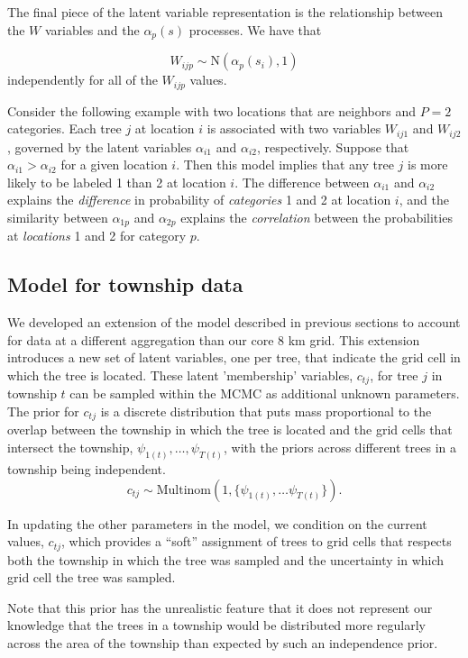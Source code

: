 \documentclass[12pt]{article}\usepackage[]{graphicx}\usepackage[]{color}
\begin{document}
\noindent The final piece of the latent variable representation is
the relationship between the $W$ variables and the $\alpha_{p}(s)$
processes. We have that

\noindent 
\[
W_{ijp}\sim\mbox{N}(\alpha_{p}(s_{i}),1)
\]
independently for all of the $W_{ijp}$ values. 

\noindent Consider the following example with two locations that are
neighbors and $P=2$ categories. Each tree $j$ at location $i$ is
associated with two variables $W_{ij1}$ and $W_{ij2}$, governed
by the latent variables $\alpha_{i1}$ and $\alpha_{i2}$, respectively.
Suppose that $\alpha_{i1}>\alpha_{i2}$ for a given location $i$.
Then this model implies that any tree $j$ is more likely to be labeled
1 than 2 at location $i$. The difference between $\alpha_{i1}$ and
$\alpha_{i2}$ explains the \textit{difference} in probability of
\textit{categories} 1 and 2 at location $i$, and the similarity between
$\alpha_{1p}$ and $\alpha_{2p}$ explains the \textit{correlation}
between the probabilities at \textit{locations} 1 and 2 for category
$p$.


\subsection{Model for township data\label{sub:Model-for-township}}

We developed an extension of the model described in previous sections
to account for data at a different aggregation than our core 8 km
grid. This extension introduces a new set of latent variables, one
per tree, that indicate the grid cell in which the tree is located.
These latent 'membership' variables, $c_{tj}$, for tree $j$ in township
$t$ can be sampled within the MCMC as additional unknown parameters.
The prior for $c_{tj}$ is a discrete distribution that puts mass
proportional to the overlap between the township in which the tree
is located and the grid cells that intersect the township, $\psi_{1(t)},\ldots,\psi_{T(t)}$,
with the priors across different trees in a township being independent.
\[
c_{tj}\sim\mbox{Multinom}(1,\{\psi_{1(t)},\ldots\psi_{T(t)}\}).
\]


In updating the other parameters in the model, we condition on the
current values, $c_{tj}$, which provides a ``soft'' assignment
of trees to grid cells that respects both the township in which the
tree was sampled and the uncertainty in which grid cell the tree was
sampled.

Note that this prior has the unrealistic feature that it does not
represent our knowledge that the trees in a township would be distributed
more regularly across the area of the township than expected by such
an independence prior.
\end{document}
